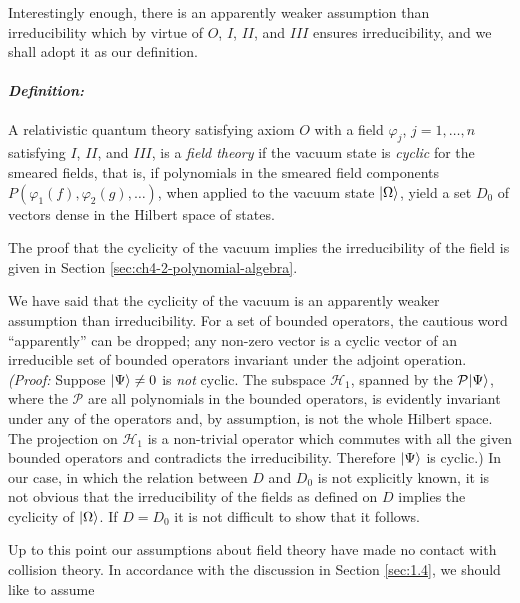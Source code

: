 Interestingly enough, there is an apparently weaker assumption than
irreducibility which by virtue of $O$, $I$, $II$, and $III$ ensures
irreducibility, and we shall adopt it as our definition.

\paragraph{\emph{Definition:}}

A relativistic quantum theory satisfying axiom $O$ with a field $\varphi_j$,
$j=1,\ldots,n$ satisfying $I$, $II$, and $III$, is a \emph{field theory} if
the vacuum state is \emph{cyclic} for the smeared fields, that is, if
polynomials in the smeared field components
$P(\varphi_1(f),\varphi_2(g),\ldots)$, when applied to the vacuum state
$\lvert \Omega\rangle$, yield a set $D_0$ of vectors dense in the Hilbert space of
states.

The proof that the cyclicity of the vacuum implies the irreducibility of the
field is given in Section \ref{sec:ch4-2-polynomial-algebra}.

We have said that the cyclicity of the vacuum is an apparently weaker
assumption than irreducibility. For a set of bounded operators, the cautious
word ``apparently'' can be dropped; any non-zero vector is a cyclic vector of
an irreducible set of bounded operators invariant under the adjoint operation.
\emph{(Proof:} Suppose $\lvert \Psi\rangle\neq0$ is \emph{not} cyclic. The subspace
$\mathcal{H}_1$, spanned by the $\mathcal{P}\lvert \Psi\rangle$, where the $\mathcal{P}$
are all polynomials in the bounded operators, is evidently invariant under
any of the operators and, by assumption, is not the whole Hilbert space. The
projection on $\mathcal{H}_1$ is a non-trivial operator which commutes with all
the given bounded operators and contradicts the irreducibility. Therefore
$\lvert \Psi\rangle$ is cyclic.) In our case, in which the relation between $D$ and
$D_0$ is not explicitly known, it is not obvious that the irreducibility of
the fields as defined on $D$ implies the cyclicity of $\lvert \Omega\rangle$. If
$D=D_0$ it is not difficult to show that it follows.

Up to this point our assumptions about field theory have made no contact with
collision theory. In accordance with the discussion in Section \ref{sec:1.4}, we should
like to assume

